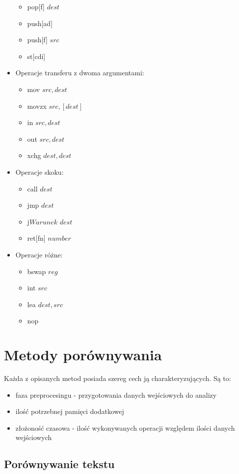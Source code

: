 \documentclass[a4paper,12pt]{article}
\begin{document}
\begin{itemize}
\begin{itemize}
	\item pop[f] $dest$
	\item push[ad]
	\item push[f] $src$
	\item st[cdi]
	\end{itemize}
\item Operacje transferu z dwoma argumentami:
	\begin{itemize}
	\item mov $src, dest$
	\item movzx $src, [dest]$
	\item in $src, dest$
	\item out $src, dest$
	\item xchg $dest, dest$
	\end{itemize}
\item Operacje skoku:
	\begin{itemize}
	\item call $dest$
	\item jmp $dest$
	\item j$Warunek$ $dest$
	\item ret[fn] $number$
	\end{itemize}
\item Operacje różne:
	\begin{itemize}
	\item bswap $reg$
	\item int $src$
	\item lea $dest, src$
	\item nop
	\end{itemize}
\end{itemize}

\newpage

\section{Metody porównywania}

Każda z opisanych metod posiada szereg cech ją charakteryzujących. Są to:
\begin{itemize}
\item faza preprocesingu - przygotowania danych wejściowych do analizy
\item ilość potrzebnej pamięci dodatkowej
\item złożoność czasowa - ilość wykonywanych operacji względem ilości danych wejściowych
\end{itemize}

\subsection{Porównywanie tekstu}
\end{document}
